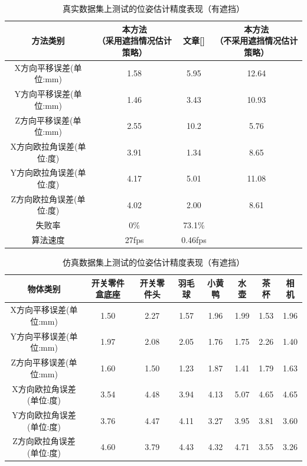 \begin{table}[htb]
	\caption{真实数据集上测试的位姿估计精度表现（有遮挡）} 
	\centering 
	\begin{tabular}[t]{
		cccc} 
		\toprule
		方法类别 & \makecell[c]{本方法\\（采用遮挡情况估计策略）} & 文章[\citenum{drost2010model}] & \makecell[c]{本方法\\（不采用遮挡情况估计策略）}\\ 
		\midrule
		X方向平移误差(单位:mm) & 1.58 & 5.95 & 12.64\\
		Y方向平移误差(单位:mm) & 1.46 & 3.43 & 10.93\\
		Z方向平移误差(单位:mm) & 2.55 & 10.2 & 5.76\\
		X方向欧拉角误差(单位:度) & 3.91 & 1.34 & 8.65\\
		Y方向欧拉角误差(单位:度) & 4.17 & 5.01 & 11.08\\
		Z方向欧拉角误差(单位:度) & 4.02 & 2.00 & 8.61\\
		\midrule
		失败率 & 0\% & 73.1\% & \/\\
		\midrule
		算法速度 & 27fps & 0.46fps & \/ \\
		\bottomrule
	\end{tabular}
\end{table}

\begin{table}[htb]
	\caption{仿真数据集上测试的位姿估计精度表现（有遮挡）} 
	\centering 
	\begin{tabular}[t]{
		cccccccc} 
		\toprule
		物体类别 & 开关零件盒底座 & 开关零件头 & 羽毛球 & 小黄鸭 & 水壶 & 茶杯 & 相机\\ 
		\midrule
		X方向平移误差(单位:mm) &1.50&2.27&1.57&1.96&1.99&1.53&1.96 \\
		Y方向平移误差(单位:mm) & 1.97 & 2.08 & 2.05&1.76&1.75&2.26&1.40 \\
		Z方向平移误差(单位:mm) &1.60&1.50&1.23&1.87&1.41&1.79&1.63 \\
		X方向欧拉角误差(单位:度) &3.54&4.48&3.94&4.13&5.07&4.65&4.65 \\
		Y方向欧拉角误差(单位:度) &3.76&4.47&4.11&3.27&3.95&3.81&3.60 \\
		Z方向欧拉角误差(单位:度) &4.60&3.79&4.43&4.32&4.71&3.55&3.26 \\
		\bottomrule
	\end{tabular}
\end{table}

